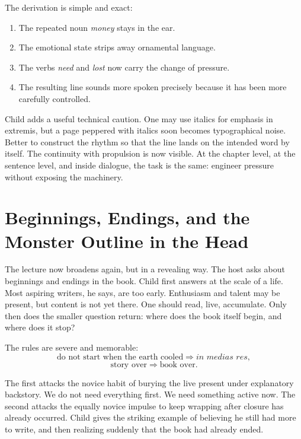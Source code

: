The derivation is simple and exact:
\begin{enumerate}
\item The repeated noun \emph{money} stays in the ear.
\item The emotional state strips away ornamental language.
\item The verbs \emph{need} and \emph{lost} now carry the change of pressure.
\item The resulting line sounds more spoken precisely because it has been more carefully controlled.
\end{enumerate}

Child adds a useful technical caution. One may use italics for emphasis in extremis, but a page peppered with italics soon becomes typographical noise. Better to construct the rhythm so that the line lands on the intended word by itself. The continuity with propulsion is now visible. At the chapter level, at the sentence level, and inside dialogue, the task is the same: engineer pressure without exposing the machinery.

\section{Beginnings, Endings, and the Monster Outline in the Head}

The lecture now broadens again, but in a revealing way. The host asks about beginnings and endings in the book. Child first answers at the scale of a life. Most aspiring writers, he says, are too early. Enthusiasm and talent may be present, but content is not yet there. One should read, live, accumulate. Only then does the smaller question return: where does the book itself begin, and where does it stop?

The rules are severe and memorable:
\begin{equation}
\text{do not start when the earth cooled} \Longrightarrow \textit{in medias res},
\end{equation}
\begin{equation}
\text{story over} \Longrightarrow \text{book over}.
\end{equation}

The first attacks the novice habit of burying the live present under explanatory backstory. We do not need everything first. We need something active now. The second attacks the equally novice impulse to keep wrapping after closure has already occurred. Child gives the striking example of believing he still had more to write, and then realizing suddenly that the book had already ended.

